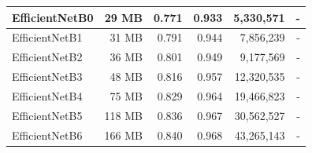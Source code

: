 \begin{table}[h!]
\begin{tabular}{|l|r|r|r|r|r|}
    EfficientNetB0                                               & 29 MB                              & 0.771                                                                                   & 0.933                                                                                   & 5,330,571                                & -                                   \\ \hline
    EfficientNetB1                                               & 31 MB                              & 0.791                                                                                   & 0.944                                                                                   & 7,856,239                                & -                                   \\ \hline
    EfficientNetB2                                               & 36 MB                              & 0.801                                                                                   & 0.949                                                                                   & 9,177,569                                & -                                   \\ \hline
    EfficientNetB3                                               & 48 MB                              & 0.816                                                                                   & 0.957                                                                                   & 12,320,535                               & -                                   \\ \hline
    EfficientNetB4                                               & 75 MB                              & 0.829                                                                                   & 0.964                                                                                   & 19,466,823                               & -                                   \\ \hline
    EfficientNetB5                                               & 118 MB                             & 0.836                                                                                   & 0.967                                                                                   & 30,562,527                               & -                                   \\ \hline
    EfficientNetB6                                               & 166 MB                             & 0.840                                                                                   & 0.968                                                                                   & 43,265,143                               & -                                   \\ \hline

\end{tabular}
\end{table}
